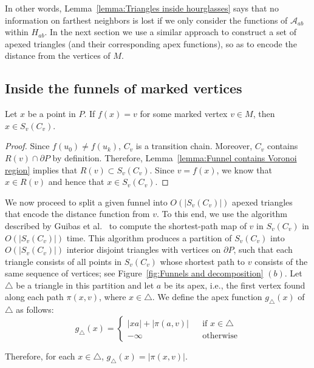 \documentclass[a4paper,UKenglish]{lipics}
\newcommand{\fn}[2]{\ensuremath{S_{\scriptscriptstyle #1}(#2)}}
\newcommand{\ff}[1]{\ensuremath{f(#1)}}
\newcommand{\g}[2]{\ensuremath{|\pi(#1, #2)|}}
\newcommand{\p}[2]{\ensuremath{\pi(#1, #2)}}
\begin{document}
In other words, Lemma~\ref{lemma:Triangles inside hourglasses} says that no information on farthest neighbors is lost if we only consider the functions of $\mathcal A_{ab}$ within $H_{ab}$.  
In the next section we use a similar approach to construct a set of apexed triangles (and their corresponding apex functions), so as to encode the distance from the vertices of $M$.

\subsection{Inside the funnels of marked vertices}

\begin{lemma}\label{lemma:Farthest points from marked are in funnel}
Let $x$ be a point in $P$. If $\ff{x} = v$ for some marked vertex $v\in M$, then $x\in \fn{v}{C_v}$.
\end{lemma}
\begin{proof}
Since $\ff{u_0} \neq \ff{u_k}$, $C_v$ is a transition chain. Moreover, $C_v$ contains $R(v)\cap \partial P$ by definition. Therefore, Lemma~\ref{lemma:Funnel contains Voronoi region} implies that $R(v)\subset \fn{v}{C_v}$.
Since $v = \ff{x}$, we know that $x\in R(v)$ and hence that $x \in \fn{v}{C_v}$. 
\end{proof}

We now proceed to split a given funnel into $O(|\fn{v}{C_v}|)$ apexed triangles that encode the distance function from $v$. 
To this end, we use the algorithm described by Guibas et al.~\cite[Section 2]{guibasShortestPathQueries} to compute the shortest-path map of $v$ in $\fn{v}{C_v}$ in $O(|\fn{v}{C_v}|)$ time.
This algorithm produces a partition of $\fn{v}{C_v}$ into $O(|\fn{v}{C_v}|)$ interior disjoint triangles with vertices on $\partial P$, such that each triangle consists of all points in $\fn{v}{C_v}$ whose shortest path to $v$ consists of the same sequence of vertices; see Figure~\ref{fig:Funnels and decomposition} $(b)$.
Let $\triangle$ be a triangle in this partition and let $a$ be its apex, i.e., the first vertex found along each path $\p{x}{v}$, where $x\in \triangle$. We define the apex function $g_\triangle(x)$ of $\triangle$ as follows:
$$g_\triangle(x) = \left\{ \begin{array}{lll}
|x a| + \g{a}{v} && \text{if }x\in \triangle\\
-\infty&&\text{otherwise}
\end{array}\right.$$

Therefore, for each $x\in \triangle$, $g_\triangle(x) = \g{x}{v}$.
\end{document}
